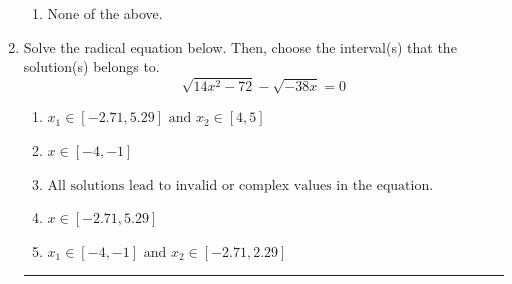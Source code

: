 \documentclass[14pt]{extbook}
\newcommand{\litem}[1]{\item#1\hspace*{-1cm}\rule{\textwidth}{0.4pt}}
\begin{document}
\begin{enumerate}
{\begin{enumerate}[label=\Alph*.]
\item None of the above.
\end{enumerate} }
\litem{
Solve the radical equation below. Then, choose the interval(s) that the solution(s) belongs to.\[ \sqrt{14 x^2 - 72} - \sqrt{-38 x} = 0 \]\begin{enumerate}[label=\Alph*.]
\item \( x_1 \in [-2.71, 5.29] \text{ and } x_2 \in [4,5] \)
\item \( x \in [-4,-1] \)
\item \( \text{All solutions lead to invalid or complex values in the equation.} \)
\item \( x \in [-2.71,5.29] \)
\item \( x_1 \in [-4, -1] \text{ and } x_2 \in [-2.71,2.29] \)


\end{enumerate}}
\end{enumerate}
\end{document}
